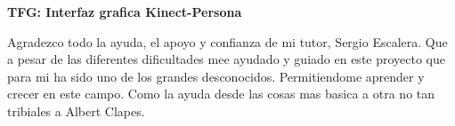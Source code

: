 \emph{ }

\vspace{10mm}
\textbf{\huge{TFG: Interfaz grafica Kinect-Persona}}
\vspace{2mm}

\cleardoublepage

Agradezco todo la ayuda, el apoyo y confianza de mi tutor, Sergio Escalera. Que a pesar de las diferentes dificultades mee ayudado y guiado en este proyecto que para mi ha sido uno de los grandes desconocidos. Permitiendome aprender y crecer en este campo.
Como la ayuda desde las cosas mas basica a otra no tan tribiales a Albert Clapes.

\newpage

